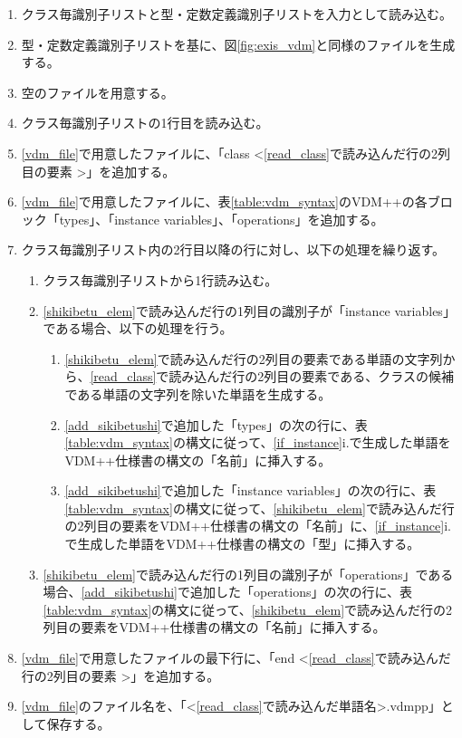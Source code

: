 \begin{enumerate}
    \item クラス毎識別子リストと型・定数定義識別子リストを入力として読み込む。
    \item 型・定数定義識別子リストを基に、図\ref{fig:exis_vdm}と同様のファイルを生成する。
    \label{katateisu_vdm}
    \item 空のファイルを用意する。
    \label{vdm_file}
    \item クラス毎識別子リストの1行目を読み込む。
    \label{read_class}
    \item \ref{vdm_file}で用意したファイルに、「class \textless \ref{read_class}で読み込んだ行の2列目の要素 \textgreater」を追加する。
    \item \ref{vdm_file}で用意したファイルに、表\ref{table:vdm_syntax}のVDM++の各ブロック「types」、「instance variables」、「operations」を追加する。
    \label{add_sikibetushi}
    \item クラス毎識別子リスト内の2行目以降の行に対し、以下の処理を繰り返す。
        \begin{enumerate}
            \item クラス毎識別子リストから1行読み込む。
            \label{shikibetu_elem}
            \item \ref{shikibetu_elem}で読み込んだ行の1列目の識別子が「instance variables」である場合、以下の処理を行う。
            \label{if_instance}
                \begin{enumerate}
                    \item \ref{shikibetu_elem}で読み込んだ行の2列目の要素である単語の文字列から、\ref{read_class}で読み込んだ行の2列目の要素である、クラスの候補である単語の文字列を除いた単語を生成する。
                    \label{read_kata}
                    \item \ref{add_sikibetushi}で追加した「types」の次の行に、表{\ref{table:vdm_syntax}}の構文に従って、\ref{if_instance}i.で生成した単語をVDM++仕様書の構文の「名前」に挿入する。
                    \item \ref{add_sikibetushi}で追加した「instance variables」の次の行に、表\ref{table:vdm_syntax}の構文に従って、\ref{shikibetu_elem}で読み込んだ行の2列目の要素をVDM++仕様書の構文の「名前」に、\ref{if_instance}i.で生成した単語をVDM++仕様書の構文の「型」に挿入する。
                \end{enumerate}
            \item \ref{shikibetu_elem}で読み込んだ行の1列目の識別子が「operations」である場合、\ref{add_sikibetushi}で追加した「operations」の次の行に、表{\ref{table:vdm_syntax}}の構文に従って、\ref{shikibetu_elem}で読み込んだ行の2列目の要素をVDM++仕様書の構文の「名前」に挿入する。
        \end{enumerate}
    \item \ref{vdm_file}で用意したファイルの最下行に、「end \textless \ref{read_class}で読み込んだ行の2列目の要素 \textgreater」を追加する。
    \item \ref{vdm_file}のファイル名を、「\textless \ref{read_class}で読み込んだ単語名\textgreater.vdmpp」として保存する。
\end{enumerate}

